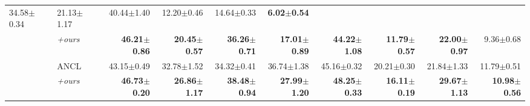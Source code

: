 \documentclass[10pt,twocolumn,letterpaper]{article}
\newcommand\ta{TA}
\newcommand\wu{WU}
\begin{document}
\begin{table*}[!ht]
{\begin{tabular}{@{}llrrrrrrrr@{}}
  34.58$\pm$0.34 &
  21.13$\pm$1.17 &
  40.44$\pm$1.40 &
  12.20$\pm$0.46 &
  14.64$\pm$0.33 &
  \textbf{6.02$\pm$0.54} \\
& \textit{+ours} &
  \textbf{46.21$\pm$0.86} &
  \textbf{20.45$\pm$0.57} &
  \textbf{36.26$\pm$0.71} &
  \textbf{17.01$\pm$0.89} &
  \textbf{44.22$\pm$1.08} &
  \textbf{11.79$\pm$0.57} &
  \textbf{22.00$\pm$0.97} &
  9.36$\pm$0.68 \\ \cmidrule{2-10}
 & ANCL \ & 43.15$\pm$0.49 & 32.78$\pm$1.52 & 34.32$\pm$0.41 & 36.74$\pm$1.38 & 45.16$\pm$0.32 & 20.21$\pm$0.30  & 21.84$\pm$1.33 & 11.79$\pm$0.51 \\
 &  \textit{+ours} & \textbf{46.73$\pm$0.20}  & \textbf{26.86$\pm$1.17} & \textbf{38.48$\pm$0.94} & \textbf{27.99$\pm$1.20}  & \textbf{48.25$\pm$0.33} & \textbf{16.11$\pm$0.19} & \textbf{29.67$\pm$1.13} & \textbf{10.98$\pm$0.56}
  \\ \midrule



\end{tabular}}
\end{table*}
\end{document}
